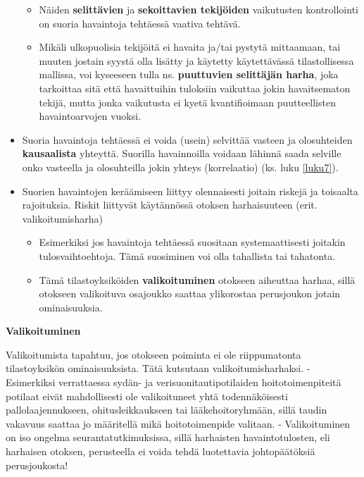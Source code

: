 \documentclass[
]{book}
\providecommand{\tightlist}{%
  \setlength{\itemsep}{0pt}\setlength{\parskip}{0pt}}
\begin{document}
\begin{itemize}
  \begin{itemize}
  \tightlist
  \item
    Näiden \textbf{selittävien} ja \textbf{sekoittavien tekijöiden} vaikutusten kontrollointi on suoria havaintoja tehtäessä vaativa tehtävä.
  \item
    Mikäli ulkopuolisia tekijöitä ei havaita ja/tai pystytä mittaamaan, tai muuten jostain syystä olla lisätty ja käytetty käytettävässä tilastollisessa mallissa, voi kyseeseen tulla ns. \textbf{puuttuvien selittäjän harha}, joka tarkoittaa sitä että havaittuihin tuloksiin vaikuttaa jokin havaitsematon tekijä, mutta jonka vaikutusta ei kyetä kvantifioimaan puutteellisten havaintoarvojen vuoksi.
  \end{itemize}
\item
  Suoria havaintoja tehtäessä ei voida (usein) selvittää vasteen ja olosuhteiden \textbf{kausaalista} yhteyttä. Suorilla havainnoilla voidaan lähinnä saada selville onko vasteella ja olosuhteilla jokin yhteys (korrelaatio) (ks. luku \ref{luku7}).
\item
  Suorien havaintojen keräämiseen liittyy olennaisesti joitain riskejä ja toisaalta rajoituksia. Riskit liittyvät käytännössä otoksen harhaisuuteen (erit. valikoitumisharha)

  \begin{itemize}
  \tightlist
  \item
    Esimerkiksi jos havaintoja tehtäessä suositaan systemaattisesti joitakin tulosvaihtoehtoja. Tämä suosiminen voi olla tahallista tai tahatonta.
  \item
    Tämä tilastoyksiköiden \textbf{valikoituminen} otokseen aiheuttaa harhaa, sillä otokseen valikoituva osajoukko saattaa ylikorostaa perusjoukon jotain ominaisuuksia.
  \end{itemize}
\end{itemize}

\begin{noteblock}{}
\textbf{Valikoituminen}

Valikoitumista tapahtuu, jos otokseen poiminta ei ole riippumatonta tilastoyksikön ominaisuuksista. Tätä kutsutaan valikoitumisharhaksi.
- Esimerkiksi verrattaessa sydän- ja verisuonitautipotilaiden hoitotoimenpiteitä potilaat eivät mahdollisesti ole valikoituneet yhtä todennäköisesti pallolaajennukseen, ohitusleikkaukseen tai lääkehoitoryhmään, sillä taudin vakavuus saattaa jo määritellä mikä hoitotoimenpide valitaan.
- Valikoituminen on iso ongelma seurantatutkimuksissa, sillä harhaisten havaintotulosten, eli harhaisen otoksen, perusteella ei voida tehdä luotettavia johtopäätöksiä perusjoukosta!

\end{noteblock}
\end{document}
